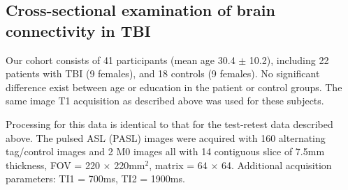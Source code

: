 \documentclass{llncs}
\begin{document}

\subsection{Cross-sectional examination of brain connectivity in TBI}
 Our cohort consists of 41 participants (mean age 30.4 $\pm$ 10.2), including 22 patients with TBI (9 females), and 18 controls (9 females). No significant difference exist between age or education in the patient or control groups.  The same image T1 acquisition as described above was used for these subjects.

 Processing for this data is identical to that for the test-retest data described above. The pulsed ASL (PASL) images were acquired with 160 alternating tag/control images and 2 M0 images all with 14 contiguous slice of 7.5mm thickness, FOV = 220 $\times$ 220mm$^2$, matrix = 64 $\times$ 64. Additional acquisition parameters: TI1 =  700ms, TI2 = 1900ms.
\end{document}

